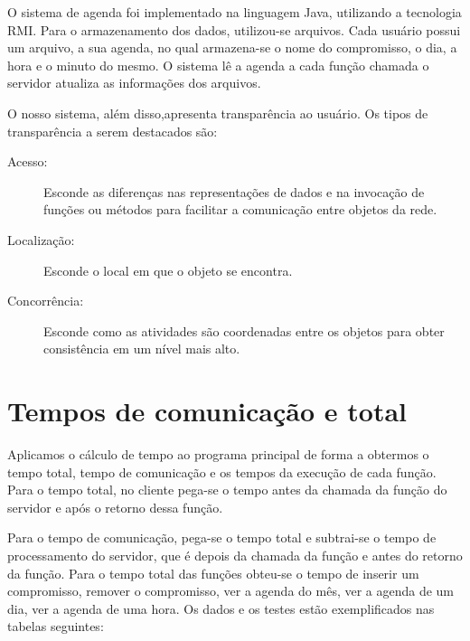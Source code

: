 \documentclass[10pt,a4paper]{article}
\begin{document}
O sistema de agenda foi implementado na linguagem Java, utilizando a tecnologia RMI. Para o armazenamento dos dados, utilizou-se arquivos. Cada
usuário possui um arquivo, a sua agenda, no qual armazena-se o nome do compromisso, o dia, a hora e o minuto do
mesmo. O sistema lê a agenda a cada função chamada o servidor atualiza as informações dos arquivos.

O nosso sistema, além disso,apresenta transparência ao usuário. Os tipos de transparência a serem destacados são:
\begin{description}
\item[Acesso:] Esconde as diferenças nas representações de dados e na invocação de funções ou métodos para facilitar a comunicação
  entre objetos da rede.
\item[Localização:] Esconde o local em que o objeto se encontra.
\item[Concorrência:] Esconde como as atividades são coordenadas entre os objetos para obter consistência em um nível mais
  alto.
\end{description}


\section{Tempos de comunicação e total}
Aplicamos o cálculo de tempo ao programa principal de forma a obtermos o tempo total, tempo de comunicação e
os tempos da execução de cada função. Para o tempo total, no cliente pega-se o tempo antes da chamada da função do servidor e após o
retorno dessa função.

Para o tempo de comunicação, pega-se o tempo total e subtrai-se o tempo de processamento do servidor, que
é depois da chamada da função e antes do retorno da função.
Para o tempo total das funções obteu-se o tempo de inserir um compromisso, remover o compromisso, ver a agenda
do mês, ver a agenda de um dia, ver a agenda de uma hora. Os dados e os testes estão exemplificados nas tabelas seguintes:
\end{document}
